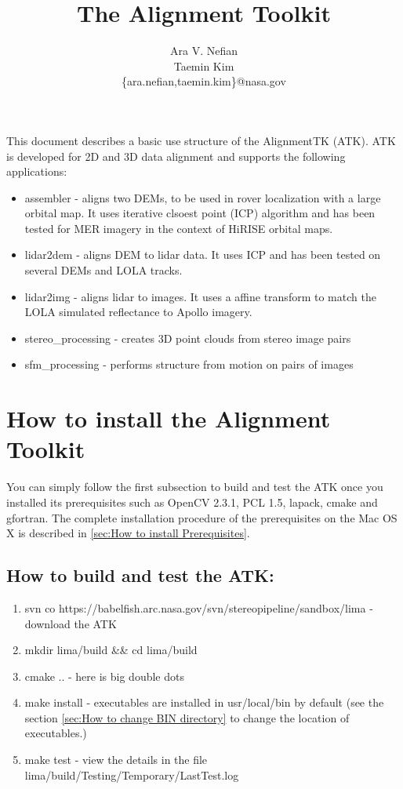 \documentclass[12pt]{article}
\begin{document}
\title {The Alignment Toolkit}
\author{Ara V. Nefian \\ Taemin Kim\\
\{ara.nefian,taemin.kim\}@nasa.gov}
\maketitle

This document describes a basic use structure of the AlignmentTK (ATK). ATK is developed for 2D and 3D data alignment and supports the following applications:
\begin{itemize}
\item assembler - aligns two DEMs, to be used in rover localization with a large orbital map. It uses iterative clsoest point (ICP) algorithm and has 
been tested for MER imagery in the context of HiRISE orbital maps.
\item lidar2dem - aligns DEM to lidar data. It uses ICP and has been tested on several DEMs and LOLA tracks.
\item lidar2img - aligns lidar to images. It uses a affine transform to match the LOLA simulated reflectance to Apollo imagery.
\item stereo\_processing - creates 3D point clouds from stereo image pairs
\item sfm\_processing - performs structure from motion on pairs of images
\end{itemize} 

\section{How to install the Alignment Toolkit}
You can simply follow the first subsection to build and test the ATK once you installed its prerequisites such as OpenCV 2.3.1, PCL 1.5, lapack, cmake and gfortran. The complete installation procedure of the prerequisites on the Mac OS X is described in \ref{sec:How to install Prerequisites}.

\subsection{How to build and test the ATK:}
\begin{enumerate}
	\item{svn co  https://babelfish.arc.nasa.gov/svn/stereopipeline/sandbox/lima} - download the ATK
	\item{mkdir lima/build \&\& cd lima/build}
	\item{cmake ..} - here is big double dots 
	\item{make install} - executables are installed in usr/local/bin by default (see the section \ref{sec:How to change BIN directory} to change the location of executables.)
	\item{make test} - view the details in the file lima/build/Testing/Temporary/LastTest.log
\end{enumerate}
\end{document}
